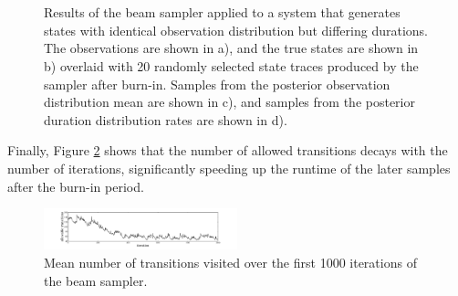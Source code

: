 \begin{figure}
     \\
     \\
    \caption{Results of the beam sampler applied to a system that generates states with identical observation distribution but differing durations. The observations are shown in a), and the true states are shown in b) overlaid with 20 randomly selected state traces produced by the sampler after burn-in. Samples from the posterior observation distribution mean are shown in c), and samples from the posterior duration distribution rates are shown in d).}
    \label{fig:experiment2_results}
\end{figure}



Finally, Figure \ref{fig:allowed} shows that the number of allowed transitions decays with the number of iterations, significantly speeding up the runtime of the later samples after the burn-in period. 


\begin{figure}
    \includegraphics[width=0.5\textwidth]{../pic/number_transitions_visited.pdf}

\caption{Mean number of transitions visited over the first 1000 iterations of the beam sampler.}
\label{fig:allowed}
\end{figure}
